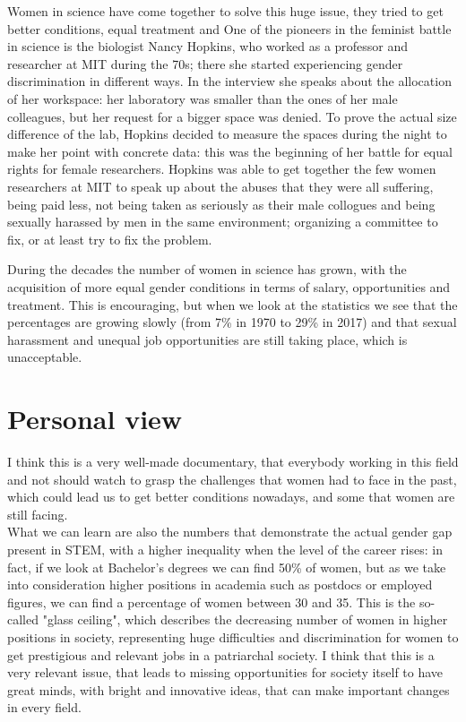 Women in science have come together to solve this huge issue, they tried to get better conditions, equal treatment and
One of the pioneers in the feminist battle in science is the biologist Nancy Hopkins, who worked as a professor and researcher at MIT during the 70s; there she started experiencing gender discrimination in different ways. In the interview she speaks about the allocation of her workspace: her laboratory was smaller than the ones of her male colleagues, but her request for a bigger space was denied.  
To prove the actual size difference of the lab, Hopkins decided to measure the spaces during the night to make her point with concrete data: this was the beginning of her battle for equal rights for female researchers. Hopkins was able to get together the few women researchers at MIT to speak up about the abuses that they were all suffering, being paid less, not being taken as seriously as their male collogues and being sexually harassed by men in the same environment; organizing a committee to fix, or at least try to fix the problem. 

During the decades the number of women in science has grown, with the acquisition of more equal gender conditions in terms of salary, opportunities and treatment. This is encouraging, but when we look at the statistics we see that the percentages are growing slowly (from 7\% in 1970 to 29\% in 2017) and that sexual harassment and unequal job opportunities are still taking place, which is unacceptable. 

\section*{Personal view}
I think this is a very well-made documentary, that everybody working in this field and not should watch to grasp the challenges that women had to face in the past, which could lead us to get better conditions nowadays, and some that women are still facing.\\
What we can learn are also the numbers that demonstrate the actual gender gap present in STEM, with a higher inequality when the level of the career rises: in fact, if we look at Bachelor's degrees we can find 50\% of women, but as we take into consideration higher positions in academia such as postdocs or employed figures, we can find a percentage of women between 30 and 35. This is the so-called "glass ceiling", which describes the decreasing number of women in higher positions in society, representing huge difficulties and discrimination for women to get prestigious and relevant jobs in a patriarchal society.
I think that this is a very relevant issue, that leads to missing opportunities for society itself to have great minds, with bright and innovative ideas, that can make important changes in every field. 

